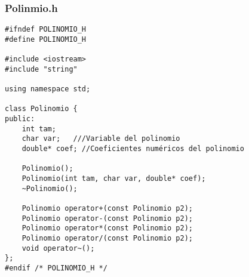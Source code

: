 \documentclass[11pt]{article}
\begin{document}
\subsubsection*{Polinmio.h}
\begin{lstlisting}
#ifndef POLINOMIO_H
#define POLINOMIO_H

#include <iostream>
#include "string"

using namespace std;

class Polinomio {
public:
	int tam;	
	char var; 	///Variable del polinomio
	double* coef; //Coeficientes numéricos del polinomio		
	
	Polinomio();
	Polinomio(int tam, char var, double* coef);
	~Polinomio();
	
	Polinomio operator+(const Polinomio p2);
	Polinomio operator-(const Polinomio p2);
	Polinomio operator*(const Polinomio p2);
	Polinomio operator/(const Polinomio p2);
	void operator~();
};
#endif /* POLINOMIO_H */
\end{lstlisting}
\vspace{2 em}
\end{document}
